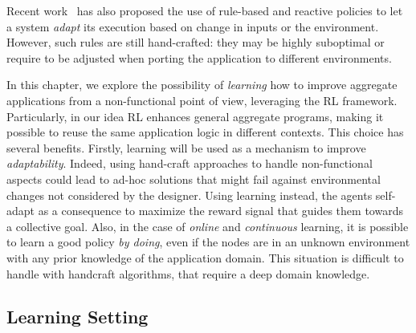 Recent work~\cite{danilo2021lmcs} has also proposed the use of rule-based and reactive policies to let a system \emph{adapt} its execution based on change in inputs or the environment.
%
However, such rules are still hand-crafted: they may be highly suboptimal or require to be adjusted when porting the application to different environments.

In this chapter, we explore the possibility of \emph{learning} 
 how to improve aggregate applications from a non-functional point of view, 
 leveraging the \ac{RL} framework.
%
Particularly, in our idea \ac{RL} enhances general aggregate programs, 
 making it possible to reuse the same application logic in different contexts.
%
This choice has several benefits.
 Firstly, learning will be used as a mechanism to improve \emph{adaptability}. 
 Indeed, using hand-craft approaches to handle non-functional aspects 
 could lead to ad-hoc solutions that might fail against environmental 
 changes not considered by the designer.
%
Using learning instead, the agents self-adapt as a consequence 
 to maximize the reward signal that guides them towards a collective goal. 
%
Also, in the case of \emph{online} and \emph{continuous} learning, 
 it is possible to learn a good policy \emph{by doing}, 
 even if the nodes are in an unknown environment with any prior knowledge of the application domain.
%
This situation is difficult to handle with handcraft algorithms, that require a deep domain knowledge.

\subsection{Learning Setting}\label{acsos2022:sec:learning-setting}

